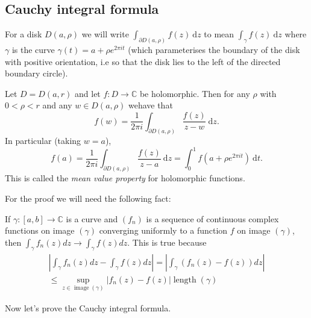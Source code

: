 \documentclass[a4paper]{scrartcl}
\begin{document}
\subsection{Cauchy integral formula}
\begin{notation}
     For a disk $D (a,\rho)$ we will write $\int_{ \partial D (a, \rho)}^{}f (z) \ \mathrm{d}z $ to mean $\int_{\gamma}^{}f (z) \ \mathrm{d}z $ where $\gamma$ is the curve $\gamma (t)=a+\rho e^{2\pi i t}$ (which parameterises the boundary of the disk with positive orientation, i.e so that the disk lies to the left of the directed boundary circle). 
\end{notation}
\begin{theorem}
      Let $D=D (a,r)$ and let $f: D \rightarrow \mathbb{C}$ be holomorphic. Then for any $\rho$ with $0 < \rho< r$ and any $w \in D (a, \rho)$ wehave that \[
      f (w)=\frac{1}{2\pi i} \int_{ \partial D (a, \rho)}^{} \frac{f (z)}{z-w} \ \mathrm{d}z
      .\] In particular (taking $w=a$), \[
          f (a)=\frac{1}{2\pi i} \int_{ \partial D (a, \rho)}^{} \frac{f (z)}{z-a} \ \mathrm{d}z= \int_{0}^{1}f (a+ \rho e^{2\pi it}) \ \mathrm{d}t 
      .\] This is called the \emph{mean value property} for holomorphic functions.
\end{theorem}
For the proof we will need the following fact:
\begin{lemma}
      If $\gamma: [a,b] \rightarrow \mathbb{C}$ is a curve and $\left(f_{n}\right)$ is a sequence of continuous complex functions on image $(\gamma)$ converging uniformly to a function $f$ on image $(\gamma)$, then $\int_{\gamma} f_{n}(z) d z \rightarrow \int_{\gamma} f(z) d z$.
      This is true because
      $$
      \begin{array}{r}
      \left|\int_{\gamma} f_{n}(z) d z-\int_{\gamma} f(z) d z\right|=\left|\int_{\gamma}\left(f_{n}(z)-f(z)\right) d z\right| \\
      \leq \sup _{z \in \operatorname{image}(\gamma)}\left|f_{n}(z)-f(z)\right| \operatorname{length}(\gamma)
      \end{array}
      $$
\end{lemma}
Now let's prove the Cauchy integral formula.
\end{document}
